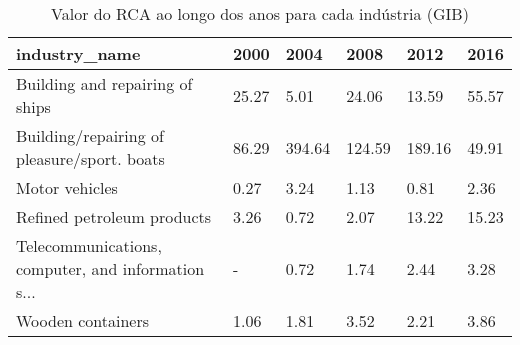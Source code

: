 \begin{table}
\centering
\caption{Valor do RCA ao longo dos anos para cada indústria (GIB)}
\begin{tabular}{p{6cm}p{1.5cm}p{1.5cm}p{1.5cm}p{1.5cm}p{1.5cm}}
\toprule
                                     industry\_name &  2000 &   2004 &   2008 &   2012 &  2016 \\
\midrule
                   Building and repairing of ships & 25.27 &   5.01 &  24.06 &  13.59 & 55.57 \\
       Building/repairing of pleasure/sport. boats & 86.29 & 394.64 & 124.59 & 189.16 & 49.91 \\
                                    Motor vehicles &  0.27 &   3.24 &   1.13 &   0.81 &  2.36 \\
                        Refined petroleum products &  3.26 &   0.72 &   2.07 &  13.22 & 15.23 \\
Telecommunications, computer, and information s... &     - &   0.72 &   1.74 &   2.44 &  3.28 \\
                                 Wooden containers &  1.06 &   1.81 &   3.52 &   2.21 &  3.86 \\
\bottomrule
\end{tabular}
\end{table}

